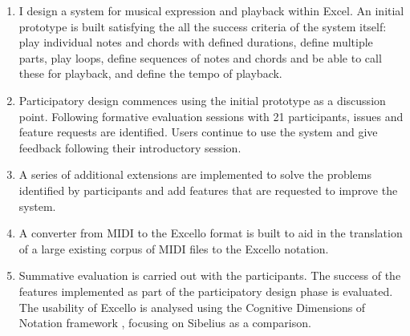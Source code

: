 \begin{enumerate}
\item I design a system for musical expression and playback within Excel. An initial prototype is built satisfying the all the success criteria of the system itself: play individual notes and chords with defined durations, define multiple parts, play loops, define sequences of notes and chords and be able to call these for playback, and define the tempo of playback.

\item Participatory design commences using the initial prototype as a discussion point. Following formative evaluation sessions with 21 participants, issues and feature requests are identified. Users continue to use the system and give feedback following their introductory session.

\item A series of additional extensions are implemented to solve the problems identified by participants and add features that are requested to improve the system.

\item A converter from MIDI to the Excello format is built to aid in the translation of a large existing corpus of MIDI files to the Excello notation.

\item Summative evaluation is carried out with the participants. The success of the features implemented as part of the participatory design phase is evaluated. The usability of Excello is analysed using the Cognitive Dimensions of Notation framework \cite{blackwell:tutorial}, focusing on Sibelius as a comparison.

\end{enumerate}
